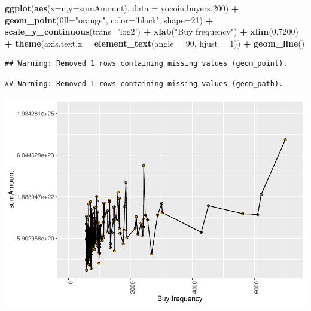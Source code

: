 \documentclass[]{article}
\newenvironment{Shaded}{\begin{snugshade}}{\end{snugshade}}
\newcommand{\KeywordTok}[1]{\textcolor[rgb]{0.13,0.29,0.53}{\textbf{#1}}}
\newcommand{\DataTypeTok}[1]{\textcolor[rgb]{0.13,0.29,0.53}{#1}}
\newcommand{\DecValTok}[1]{\textcolor[rgb]{0.00,0.00,0.81}{#1}}
\newcommand{\StringTok}[1]{\textcolor[rgb]{0.31,0.60,0.02}{#1}}
\newcommand{\OperatorTok}[1]{\textcolor[rgb]{0.81,0.36,0.00}{\textbf{#1}}}
\newcommand{\NormalTok}[1]{#1}
\begin{document}
\begin{Shaded}
\begin{Highlighting}[]
\KeywordTok{ggplot}\NormalTok{(}\KeywordTok{aes}\NormalTok{(}\DataTypeTok{x=}\NormalTok{n,}\DataTypeTok{y=}\NormalTok{sumAmount), }\DataTypeTok{data =}\NormalTok{ yocoin.buyers.}\DecValTok{200}\NormalTok{) }\OperatorTok{+}\StringTok{ }
\StringTok{  }\KeywordTok{geom_point}\NormalTok{(}\DataTypeTok{fill=}\StringTok{"orange"}\NormalTok{, }\DataTypeTok{color=}\StringTok{'black'}\NormalTok{, }\DataTypeTok{shape=}\DecValTok{21}\NormalTok{) }\OperatorTok{+}
\StringTok{  }\KeywordTok{scale_y_continuous}\NormalTok{(}\DataTypeTok{trans=}\StringTok{'log2'}\NormalTok{) }\OperatorTok{+}
\StringTok{  }\KeywordTok{xlab}\NormalTok{(}\StringTok{"Buy frequency"}\NormalTok{) }\OperatorTok{+}\StringTok{ }
\StringTok{  }\KeywordTok{xlim}\NormalTok{(}\DecValTok{0}\NormalTok{,}\DecValTok{7200}\NormalTok{) }\OperatorTok{+}\StringTok{ }
\StringTok{  }\KeywordTok{theme}\NormalTok{(}\DataTypeTok{axis.text.x =} \KeywordTok{element_text}\NormalTok{(}\DataTypeTok{angle =} \DecValTok{90}\NormalTok{, }\DataTypeTok{hjust =} \DecValTok{1}\NormalTok{)) }\OperatorTok{+}
\StringTok{  }\KeywordTok{geom_line}\NormalTok{()}
\end{Highlighting}
\end{Shaded}

\begin{verbatim}
## Warning: Removed 1 rows containing missing values (geom_point).
\end{verbatim}

\begin{verbatim}
## Warning: Removed 1 rows containing missing values (geom_path).
\end{verbatim}

\includegraphics{analysis_files/figure-latex/unnamed-chunk-84-1.pdf}
\end{document}
